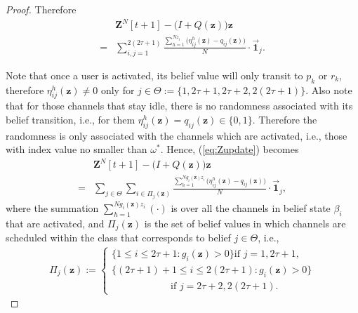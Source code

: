\documentclass[11pt,twocolumn]{IEEEtran}
\begin{document}
\begin{proof}
Therefore
\begin{align}
&\bm Z^{N}[t+1]-\big(I+Q(\bm z)\big)\bm z \nonumber\\
=& \sum_{i,j=1}^{2(2\tau+1)} \frac{\sum_{h=1}^{N z_i} \big(\eta^h_{ij}(\bm z)-q_{ij}(\bm z)\big)}{N}\cdot \vec{\bm 1}_{j}. \label{eq:Zupdate}
\end{align}

Note that once a user is activated, its belief value will only transit to $p_k$ or $r_k$, therefore $\eta^h_{ij}(\bm z)\neq 0$ only for $j\in\Theta:=\{1, 2\tau+1, 2\tau+2, 2(2\tau+1)\}$. Also note that for those channels that stay idle, there is no randomness associated with its belief transition, i.e., for them $\eta^h_{ij}(\bm z)=q_{ij}(\bm z) \in \{0, 1\}$. Therefore the randomness is only associated with the channels which are activated, i.e., those with index value no smaller than $\omega^*$. Hence, (\ref{eq:Zupdate}) becomes
\begin{align}
&\bm Z^{N}[t+1]-\big(I+Q(\bm z)\big)\bm z \nonumber\\
=& \sum_{j\in \Theta}\sum_{i \in \Pi_j(\bm z)} \frac{\sum_{h=1}^{N g_i(\bm z) z_i} \big(\eta^h_{ij}(\bm z)-q_{ij}(\bm z)\big)}{N}\cdot \vec{\bm 1}_{j}, \nonumber
\end{align}
where the summation $\sum_{h=1}^{N g_i(\bm z) z_i}(\cdot)$ is over all the channels in belief state $\beta_i$ that are activated, and $\Pi_j(\bm z)$ is the set of belief values in which channels are scheduled within the class that corresponds to belief $j \in \Theta$, i.e.,
\begin{align}
\Pi_j(\bm z){:=}\begin{cases}
\{1\leq i \leq2\tau+1: g_i(\bm z) > 0 \} \text{if $j=1, 2\tau{+}1,$} \\
\{(2\tau+1)+1 \leq i \leq 2(2\tau+1): g_i(\bm z) > 0 \}\\
\hspace{1in}\text{if $j=2\tau+2, 2(2\tau+1).$}
\end{cases} \nonumber
\end{align}


\end{proof}
\end{document}
